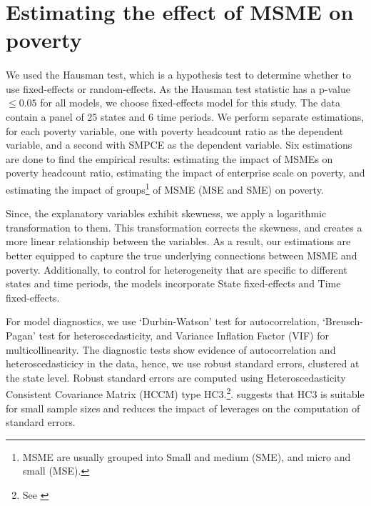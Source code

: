 \documentclass [12pt]{article}
\begin{document}
\newpage
{}

\section{Estimating the effect of MSME on poverty} \label{sec:models}
\paragraph{}  We used the Hausman test, which is a hypothesis test to determine whether to use fixed-effects or random-effects. As the Hausman test statistic has a p-value $\leq 0.05$ for all models, we choose fixed-effects model for this study. The data contain a panel of 25 states and 6 time periods. We perform separate estimations, for each poverty variable, one with poverty headcount ratio as the dependent variable, and a second with SMPCE as the dependent variable. Six estimations are done to find the empirical results: estimating the impact of MSMEs on poverty headcount ratio, estimating the impact of enterprise scale on poverty, and estimating the impact of groups\footnote{MSME are usually grouped into Small and medium (SME), and micro and small (MSE).} of MSME (MSE and SME) on poverty.

\vspace{0.3cm}
\vspace{0.3cm}

\text Since, the explanatory variables exhibit skewness, we apply a logarithmic transformation to them. This transformation corrects the skewness, and creates a more linear relationship between the variables. As a result, our estimations are better equipped to capture the true underlying connections between MSME and poverty. Additionally, to control for heterogeneity that are specific to different states and time periods, the models incorporate State fixed-effects and Time fixed-effects.

\text For model diagnostics, we use `Durbin-Watson' test for autocorrelation, `Breusch-Pagan' test for heteroscedasticity, and Variance Inflation Factor (VIF) for multicollinearity. The diagnostic tests show evidence of autocorrelation and heteroscedasticicy in the data, hence, we use robust standard errors, clustered at the state level. Robust standard errors are computed using Heteroscedasticity Consistent Covariance Matrix (HCCM) type HC3.\footnote{See \textcite{380055f1-819e-3149-a01c-cfab4e53c79f}}. \textcite{MACKINNON1985305} suggests that HC3 is suitable for small sample sizes and reduces the impact of leverages on the computation of standard errors. 
\end{document}

